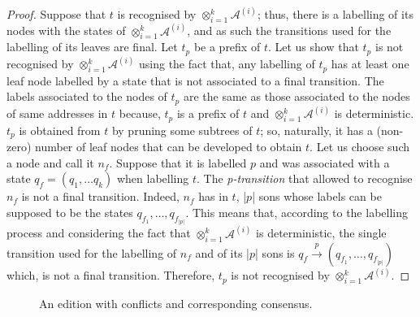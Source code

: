 \begin{proof}
Suppose that $t$ is recognised by $\otimes_{i=1}^{k}\mathcal{A}^{(i)}$; thus, there is a labelling of its nodes with the states of $\otimes_{i=1}^{k}\mathcal{A}^{(i)}$, and as such the transitions used for the labelling of its leaves are final. 
Let $t_p$ be a prefix of $t$. Let us show that $t_p$ is not recognised by $\otimes_{i=1}^{k}\mathcal{A}^{(i)}$ using the fact that, any labelling of $t_p$ has at least one leaf node labelled by a state that is not associated to a final transition.
The labels associated to the nodes of $t_p$ are the same as those associated to the nodes of same addresses in $t$ because, $t_p$ is a prefix of $t$ and $\otimes_{i=1}^{k}\mathcal{A}^{(i)}$ is deterministic. $t_p$ is obtained from $t$ by pruning some subtrees of $t$; so, naturally, it has a (non-zero) number of leaf nodes that can be developed to obtain $t$. Let us choose such a node and call it $n_f$. Suppose that it is labelled $p$ and was associated with a state $q_f= (q_{1}, \ldots q_{k})$ when labelling $t$.
The \textit{p-transition} that allowed to recognise $n_f$ is not a final transition. Indeed, $n_f$ has in $t$, |$p$| sons whose labels can be supposed to be the states $q_{f_1}, \ldots, q_{f_{|p|}}$. This means that, according to the labelling process and considering the fact that $\otimes_{i=1}^{k}\mathcal{A}^{(i)}$ is deterministic, the single transition used for the labelling of $n_f$ and of its |$p$| sons is $q_f\stackrel{p}{\rightarrow}\left(q_{f_1},\ldots,q_{f_{|p|}}\right)$ which, is not a final transition. Therefore, $t_p$ is not recognised by $\otimes_{i=1}^{k}\mathcal{A}^{(i)}$.
\end{proof}





\label{chap2:sec:consensus-illustration}
\begin{figure}[ht!]
	\noindent
	\caption{An edition with conflicts and corresponding consensus.}
	\label{chap2:fig:consensus-workflow}
\end{figure}

